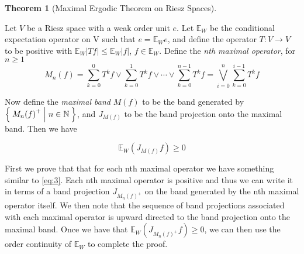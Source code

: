 \documentclass[letterpaper,10pt,oneside,onecolumn,reqno]{amsart}
\newcommand{\E}{\mathbb E}
\newcommand{\NN}{\mathbb N}
\theoremstyle{definition}
\newtheorem{thm}{Theorem}
\newcommand{\join}{\vee}
\begin{document}
\begin{thm}[Maximal Ergodic Theorem on Riesz Spaces]\label{thr:3}

  Let $V$ be a Riesz space with a weak order unit $e$. Let
  $\E_W$ be the conditional expectation operator on V such that
  $e = \E_W e$, and define the operator $T : V \to V$ to be
  positive with $\E_W|Tf| \leq \E_W|f|$, $f \in
  \E_W$. Define the \emph{nth
    maximal operator}, for $n \geq 1$
  \begin{equation}\label{eq:2}
    M_n(f) = \sum\limits_{k=0}^{0} T^k f \join \sum\limits_{k=0}^{1} T^k f \join \cdots \join \sum\limits_{k=0}^{n-1} T^k f = \bigvee_{i=0}^n \sum\limits_{k=0}^{i-1} T^k f
  \end{equation}

  Now define the \emph{maximal band} $M(f)$ to be
  the band generated by $\Set{M_n{(f)}^+ | n \in \NN}$, and $J_{M(f)}$
  to be the band projection onto the maximal band. Then we have

\begin{equation}\label{eq:3}
  \E_W(J_{M(f)}f) \geq 0
\end{equation}
\end{thm}

\begin{framed}
  First we prove that that for each nth maximal operator we have
  something similar to \eqref{eq:3}. Each nth maximal operator is
  positive and thus we can write it in terms of a band projection
  $J_{M_n{(f)}^+}$ on the band generated by the nth maximal operator
  itself. We then note that the sequence of band projections
  associated with each maximal operator is upward directed to the band
  projection onto the maximal band. Once we have that
  $\E_W(J_{M_n{(f)}^+}f) \geq 0$, we can then use the order
  continuity of $\E_W$ to complete the proof.
\end{framed}
\end{document}
